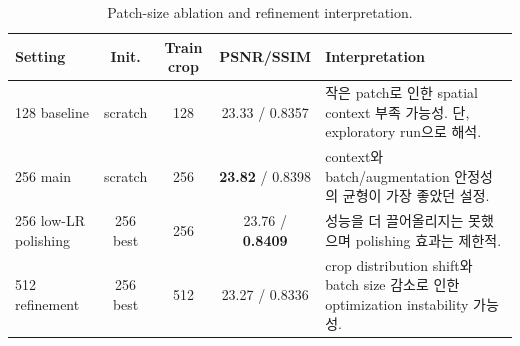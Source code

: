 \begin{table}[H]
\centering
\caption{Patch-size ablation and refinement interpretation.}
\label{tab:ablation}
\small
\begin{tabularx}{\linewidth}{l c c c X}
\toprule
Setting & Init. & Train crop & PSNR/SSIM & Interpretation \\
\midrule
128 baseline & scratch & 128 & 23.33 / 0.8357 & 작은 patch로 인한 spatial context 부족 가능성. 단, exploratory run으로 해석. \\
256 main & scratch & 256 & \textbf{23.82} / 0.8398 & context와 batch/augmentation 안정성의 균형이 가장 좋았던 설정. \\
256 low-LR polishing & 256 best & 256 & 23.76 / \textbf{0.8409} & 성능을 더 끌어올리지는 못했으며 polishing 효과는 제한적. \\
512 refinement & 256 best & 512 & 23.27 / 0.8336 & crop distribution shift와 batch size 감소로 인한 optimization instability 가능성. \\
\bottomrule
\end{tabularx}
\end{table}
